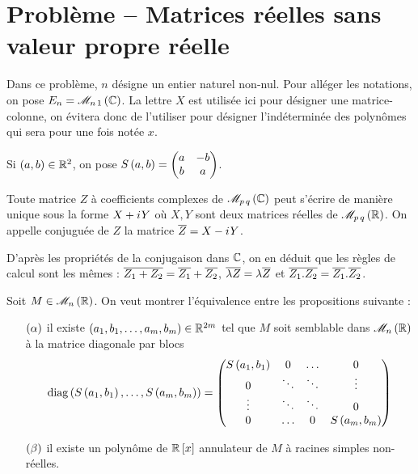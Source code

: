 \begin{corr}
\end{corr}

\section*{Problème -- Matrices réelles sans valeur propre réelle}

Dans ce problème, \(n\) désigne un entier naturel non-nul. Pour alléger les notations, on pose \(E_n=\M{n\,1}[\C]\). La lettre \(X\) est utilisée ici pour désigner une matrice-colonne, on évitera donc de l'utiliser pour désigner l'indéterminée des polynômes qui sera pour une fois notée \(x\).

Si \(\left(a,b\right)\in\mathbb{R}^2\), on pose \(S\left(a,b\right)=\begin{pmatrix}
a & -b \\
b & a
\end{pmatrix}\).

Toute matrice \(Z\) à coefficients complexes de \(\M{p\,q}[\C]\) peut s'écrire de manière unique sous la forme \(X+i\mkern1mu Y\) où \(X,Y\) sont deux matrices réelles de \(\M{p\,q}[\R]\). On appelle conjuguée de \(Z\) la matrice \(\overline{Z}=X-i\mkern1mu Y\).

D'après les propriétés de la conjugaison dans \(\mathbb{C}\), on en déduit que les règles de calcul sont les mêmes : \(\overline{Z_1+Z_2}=\overline{Z_1}+\overline{Z_2}\), \(\overline{\lambda Z}=\lambda\overline{Z}\) et \(\overline{Z_1.Z_2}=\overline{Z_1}.\overline{Z_2}\).

Soit \(M\in\M{n}[\R]\). On veut montrer l'équivalence entre les propositions suivante :

\begin{enumerate}
    \item[\(\left(\alpha\right)\)] il existe \(\left(a_1,b_1,\dots,a_m,b_m\right)\in\mathbb{R}^{2m}\) tel que \(M\) soit semblable dans \(\M{n}[\R]\) à la matrice diagonale par blocs \[\operatorname{diag}\left(S\left(a_1,b_1\right),\dots,S\left(a_m,b_m\right)\right)=\begin{pmatrix}
        S\left(a_1,b_1\right) & 0 & \dots & 0 \\
        0 & \ddots & \ddots & \vdots \\
        \vdots & \ddots & \ddots & 0 \\
        0 & \dots & 0 & S\left(a_m,b_m\right)
    \end{pmatrix}\]
    \item[\(\left(\beta\right)\)] il existe un polynôme de \(\poly[\R][x]\) annulateur de \(M\) à racines simples non-réelles.
\end{enumerate}

